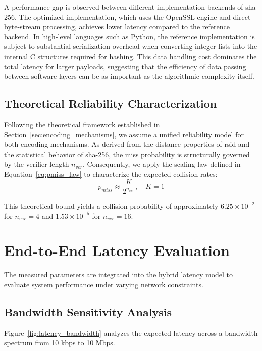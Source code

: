 \FloatBarrier

A performance gap is observed between different implementation backends of \gls{sha}-256. The optimized implementation, which uses the OpenSSL engine and direct byte-stream processing, achieves lower latency compared to the reference backend. In high-level languages such as Python, the reference implementation is subject to substantial serialization overhead when converting integer lists into the internal C structures required for hashing. This data handling cost dominates the total latency for larger payloads, suggesting that the efficiency of data passing between software layers can be as important as the algorithmic complexity itself.

\subsection{Theoretical Reliability Characterization}
\label{sec:reliability_limits}

Following the theoretical framework established in Section~\ref{sec:encoding_mechanisms}, we assume a unified reliability model for both encoding mechanisms. As derived from the distance properties of \gls{rsid} and the statistical behavior of \gls{sha}-256, the miss probability is structurally governed by the verifier length $n_{ver}$. Consequently, we apply the scaling law defined in Equation~\eqref{eq:pmiss_law} to characterize the expected collision rates:
\begin{equation}
    p_{miss} \approx \frac{K}{2^{n_{ver}}}, \quad K=1
\end{equation}

This theoretical bound yields a collision probability of approximately $6.25 \times 10^{-2}$ for $n_{ver}=4$ and $1.53 \times 10^{-5}$ for $n_{ver}=16$. 

\section{End-to-End Latency Evaluation}
\label{sec:latency_eval}

The measured parameters are integrated into the hybrid latency model to evaluate system performance under varying network constraints.

\subsection{Bandwidth Sensitivity Analysis}
Figure~\ref{fig:latency_bandwidth} analyzes the expected latency across a bandwidth spectrum from 10 kbps to 10 Mbps.

